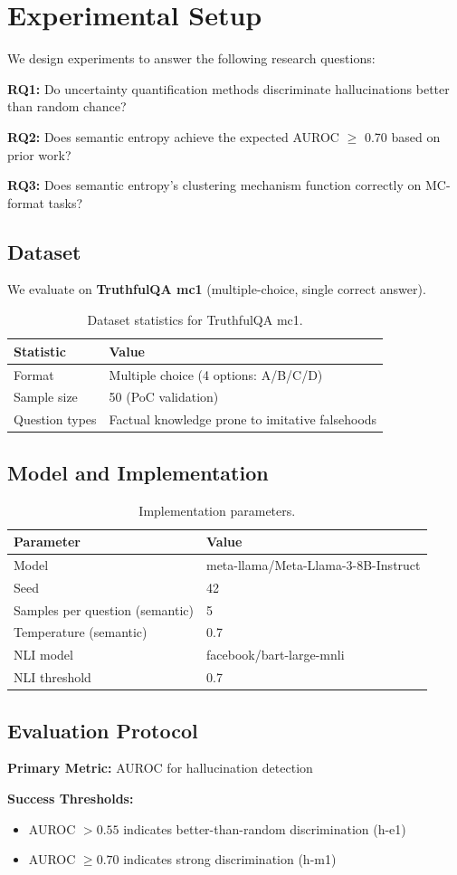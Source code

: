 \section{Experimental Setup}
\label{sec:experiments}

We design experiments to answer the following research questions:

\textbf{RQ1:} Do uncertainty quantification methods discriminate hallucinations better than random chance?

\textbf{RQ2:} Does semantic entropy achieve the expected AUROC $\geq$ 0.70 based on prior work?

\textbf{RQ3:} Does semantic entropy's clustering mechanism function correctly on MC-format tasks?

\subsection{Dataset}

We evaluate on \textbf{TruthfulQA mc1} (multiple-choice, single correct answer).

\begin{table}[h]
\centering
\begin{tabular}{ll}
\toprule
\textbf{Statistic} & \textbf{Value} \\
\midrule
Format & Multiple choice (4 options: A/B/C/D) \\
Sample size & 50 (PoC validation) \\
Question types & Factual knowledge prone to imitative falsehoods \\
\bottomrule
\end{tabular}
\caption{Dataset statistics for TruthfulQA mc1.}
\label{tab:dataset}
\end{table}

\subsection{Model and Implementation}

\begin{table}[h]
\centering
\begin{tabular}{ll}
\toprule
\textbf{Parameter} & \textbf{Value} \\
\midrule
Model & meta-llama/Meta-Llama-3-8B-Instruct \\
Seed & 42 \\
Samples per question (semantic) & 5 \\
Temperature (semantic) & 0.7 \\
NLI model & facebook/bart-large-mnli \\
NLI threshold & 0.7 \\
\bottomrule
\end{tabular}
\caption{Implementation parameters.}
\label{tab:params}
\end{table}

\subsection{Evaluation Protocol}

\textbf{Primary Metric:} AUROC for hallucination detection

\textbf{Success Thresholds:}
\begin{itemize}
    \item AUROC $> 0.55$ indicates better-than-random discrimination (h-e1)
    \item AUROC $\geq 0.70$ indicates strong discrimination (h-m1)
\end{itemize}
